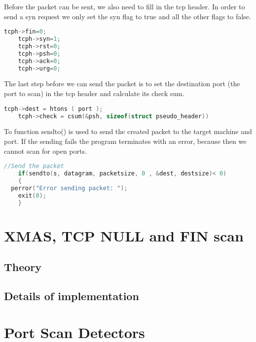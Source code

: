 \documentclass[a4paper]{scrartcl}
\begin{document}
	Before the packet can be sent, we also need to fill in the tcp header. In order to send a syn request we only set the syn flag to true and all the other flags to false.
	\begin{lstlisting}[frame= single, language=C, caption= C code to set flags in tcp header]
	tcph->fin=0;
	tcph->syn=1;
	tcph->rst=0;
	tcph->psh=0;
	tcph->ack=0;
	tcph->urg=0;
	\end{lstlisting}
	The last step before we can send the packet is to set the destination port (the port to scan)  in the tcp header and calculate its check sum.
	\begin{lstlisting}[frame= single, language=C, caption= C code to set port and calculate checksum in tcp header]
	tcph->dest = htons ( port );
	tcph->check = csum(&psh, sizeof(struct pseudo_header))
	\end{lstlisting}
	To function sendto() is used to send the created packet to the target machine and port. If the sending fails the program terminates with
	an error, because then we cannot scan for open ports.
	\begin{lstlisting}[frame= single, language=C, caption= C code to set port and calculate checksum in tcp header]
	//Send the packet
	if(sendto(s, datagram, packetsize, 0 , &dest, destsize)< 0)
	{
  perror("Error sending packet: ");
	exit(0);
	}
	\end{lstlisting}
	
	\section{XMAS, TCP NULL and FIN scan}
		\subsection{Theory}
		
		\subsection{Details of implementation}
		
	\section{Port Scan Detectors}
	
	
	
	\newpage
	\printbibliography
\end{document}
